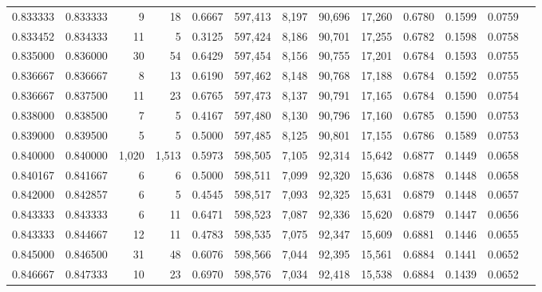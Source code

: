\begin{tabular}{rrrrrrrrrrrrr}
0.833333 & 0.833333 &      9 &    18 &                                     0.6667 & 597,413 &   8,197 &  90,696 &  17,260 & 0.6780 & 0.1599 & 0.0759 \\
0.833452 & 0.834333 &     11 &     5 &                                     0.3125 & 597,424 &   8,186 &  90,701 &  17,255 & 0.6782 & 0.1598 & 0.0758 \\
0.835000 & 0.836000 &     30 &    54 &                                     0.6429 & 597,454 &   8,156 &  90,755 &  17,201 & 0.6784 & 0.1593 & 0.0755 \\
0.836667 & 0.836667 &      8 &    13 &                                     0.6190 & 597,462 &   8,148 &  90,768 &  17,188 & 0.6784 & 0.1592 & 0.0755 \\
0.836667 & 0.837500 &     11 &    23 &                                     0.6765 & 597,473 &   8,137 &  90,791 &  17,165 & 0.6784 & 0.1590 & 0.0754 \\
0.838000 & 0.838500 &      7 &     5 &                                     0.4167 & 597,480 &   8,130 &  90,796 &  17,160 & 0.6785 & 0.1590 & 0.0753 \\
0.839000 & 0.839500 &      5 &     5 &                                     0.5000 & 597,485 &   8,125 &  90,801 &  17,155 & 0.6786 & 0.1589 & 0.0753 \\
0.840000 & 0.840000 &  1,020 & 1,513 &                                     0.5973 & 598,505 &   7,105 &  92,314 &  15,642 & 0.6877 & 0.1449 & 0.0658 \\
0.840167 & 0.841667 &      6 &     6 &                                     0.5000 & 598,511 &   7,099 &  92,320 &  15,636 & 0.6878 & 0.1448 & 0.0658 \\
0.842000 & 0.842857 &      6 &     5 &                                     0.4545 & 598,517 &   7,093 &  92,325 &  15,631 & 0.6879 & 0.1448 & 0.0657 \\
0.843333 & 0.843333 &      6 &    11 &                                     0.6471 & 598,523 &   7,087 &  92,336 &  15,620 & 0.6879 & 0.1447 & 0.0656 \\
0.843333 & 0.844667 &     12 &    11 &                                     0.4783 & 598,535 &   7,075 &  92,347 &  15,609 & 0.6881 & 0.1446 & 0.0655 \\
0.845000 & 0.846500 &     31 &    48 &                                     0.6076 & 598,566 &   7,044 &  92,395 &  15,561 & 0.6884 & 0.1441 & 0.0652 \\
0.846667 & 0.847333 &     10 &    23 &                                     0.6970 & 598,576 &   7,034 &  92,418 &  15,538 & 0.6884 & 0.1439 & 0.0652 \\

\end{tabular}
